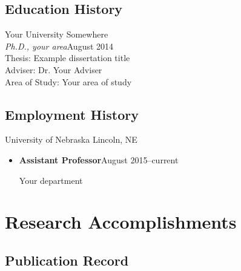 \subsection{Education History}
\begin{mydesc}
\item[Your University]\hfill Somewhere\\
  \textit{Ph.D., your area}\hfill August 2014\\
  Thesis: Example dissertation title\\
  Adviser: Dr. Your Adviser\\
  Area of Study: Your area of study

\end{mydesc}

\subsection{Employment History}
\begin{mydesc}


\item[University of Nebraska]\hfill Lincoln, NE
  \begin{itemize}
  \item \textbf{Assistant Professor}\hfill August 2015--current
  \item[] Your department
  \end{itemize}
\end{mydesc}

\section{Research Accomplishments}

\subsection{Publication Record}


